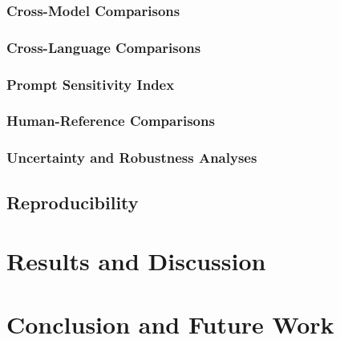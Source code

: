\documentclass[logo,msc]{infthesis}           %
\begin{document}
\hypertarget{cross-model-comparisons}{%
\subsection{Cross-Model Comparisons}\label{cross-model-comparisons}}

\hypertarget{cross-language-comparisons}{%
\subsection{Cross-Language Comparisons}\label{cross-language-comparisons}}

\hypertarget{prompt-sensitivity-index}{%
\subsection{Prompt Sensitivity Index}\label{prompt-sensitivity-index}}

\hypertarget{human-reference-comparisons}{%
\subsection{Human-Reference Comparisons}\label{human-reference-comparisons}}

\hypertarget{uncertainty-and-robustness-analyses}{%
\subsection{Uncertainty and Robustness Analyses}\label{uncertainty-and-robustness-analyses}}

\hypertarget{reproducibility}{%
\section{Reproducibility}\label{reproducibility}}

\hypertarget{results-and-discussion}{%
\chapter{Results and Discussion}\label{results-and-discussion}}

\hypertarget{conclusion-and-future-work}{%
\chapter{Conclusion and Future Work}\label{conclusion-and-future-work}}


\end{document}

